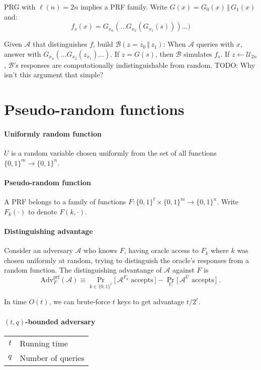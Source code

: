 \documentclass[11pt]{article}
\newcommand{\eqdef}{\ensuremath{\equiv}}
\newcommand{\cat}{\ensuremath{\,\Vert\,}}
\newcommand{\AAA}{\ensuremath{\mathcal{A}}}
\newcommand{\BBB}{\ensuremath{\mathcal{B}}}
\theoremstyle{remark}
\begin{document}
PRG with $\ell(n)=2n$ implies a PRF family. Write $G(x)=G_0(x)\cat G_1(x)$ and:
\[f_s(x) = G_{x_n}( \ldots G_{x_2}(G_{x_1}(s))) \ldots )\]

Given $\AAA$ that distinguishes $f$, build $\BBB(z=z_0\cat z_1)$:
When $\AAA$ queries with $x$, answer with $G_{x_n}(\ldots G_{x_2}(z_{x_1}) \ldots)$.
If $z=G(s)$, then $\BBB$ simulates $f_s$. If $z\gets\mathcal{U}_{2n}$, $\BBB$'s
responses are computationally indistinguishable from random.
TODO: Why isn't this argument that simple?

\section{Pseudo-random functions}

\paragraph{Uniformly random function}
$U$ is a random variable chosen uniformly from the set of all functions
$\{0,1\}^m \rightarrow \{0,1\}^n$.

\paragraph{Pseudo-random function}
A PRF belongs to a family of functions
$F : \{0,1\}^\ell \times \{0,1\}^m \rightarrow \{0,1\}^n$.
Write $F_k(\cdot)$ to denote $F(k, \cdot)$.

\paragraph{Distinguishing advantage}
Consider an adversary $\mathcal{A}$ who knows $F$, having oracle access
to $F_k$ where $k$ was chosen uniformly at random, trying to
distinguish the oracle's responses from a random function.
The distinguishing advantange of $\mathcal{A}$ against $F$ is
\[ \textrm{Adv}_F^\textrm{prf}(\mathcal{A}) \eqdef
\Pr_{k\in\{0,1\}^\ell} \big[\, \mathcal{A}^{F_k}\;\textrm{accepts} \,\big]
- \Pr_U \big[\, \mathcal{A}^U \textrm{ accepts} \,\big] \;\textrm{.} \]

In time $O(t)$, we can brute-force $t$ keys to get
advantage $t / 2^\ell$.

\paragraph{$(t,q)$-bounded adversary}
\begin{tabular}{r|l}
$t$ & Running time \\
$q$ & Number of queries
\end{tabular}
\end{document}
